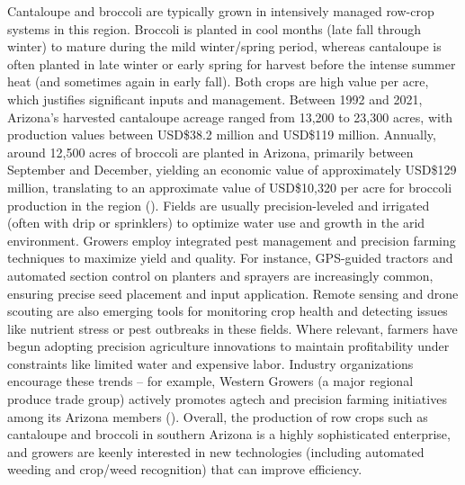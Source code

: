 \documentclass[letterpaper, notitlepage]{report}
\begin{document}
Cantaloupe and broccoli are typically grown in intensively managed row-crop systems in this region. Broccoli is planted in cool months (late fall through winter) to mature during the mild winter/spring period, whereas cantaloupe is often planted in late winter or early spring for harvest before the intense summer heat (and sometimes again in early fall). Both crops are high value per acre, which justifies significant inputs and management. Between 1992 and 2021, Arizona's harvested cantaloupe acreage ranged from 13,200 to 23,300 acres, with production values between USD\$38.2 million and USD\$119 million. Annually, around 12,500 acres of broccoli are planted in Arizona, primarily between September and December, yielding an economic value of approximately USD\$129 million, translating to an approximate value of USD\$10,320 per acre for broccoli production in the region (\cite{YCEDA2024-rt}). Fields are usually precision-leveled and irrigated (often with drip or sprinklers) to optimize water use and growth in the arid environment. Growers employ integrated pest management and precision farming techniques to maximize yield and quality. For instance, GPS-guided tractors and automated section control on planters and sprayers are increasingly common, ensuring precise seed placement and input application. Remote sensing and drone scouting are also emerging tools for monitoring crop health and detecting issues like nutrient stress or pest outbreaks in these fields. Where relevant, farmers have begun adopting precision agriculture innovations to maintain profitability under constraints like limited water and expensive labor. Industry organizations encourage these trends – for example, Western Growers (a major regional produce trade group) actively promotes agtech and precision farming initiatives among its Arizona members (\cite{Arizona-Department-of-Agriculture2018-dx}). Overall, the production of row crops such as cantaloupe and broccoli in southern Arizona is a highly sophisticated enterprise, and growers are keenly interested in new technologies (including automated weeding and crop/weed recognition) that can improve efficiency.
\end{document}
